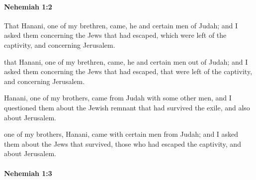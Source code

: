 		\paragraph{Nehemiah 1:2} %
			\label{NEHEMIAH-1-2}

			That Hanani, one of my brethren, came, he and certain men of Judah; and I asked them concerning the Jews that had escaped, which were left of the captivity, and concerning Jerusalem.

			\begin{versebox}
					\item[BHS] 
					\item[LXX] 
					\item[ASV] that Hanani, one of my brethren, came, he and certain men out of Judah; and I asked them concerning the Jews that had escaped, that were left of the captivity, and concerning Jerusalem.
					\item[NIV] Hanani, one of my brothers, came from Judah with some other men, and I questioned them about the Jewish remnant that had survived the exile, and also about Jerusalem.
					\item[NRSV] one of my brothers, Hanani, came with certain men from Judah; and I asked them about the Jews that survived, those who had escaped the captivity, and about Jerusalem.
			\end{versebox}

		\paragraph{Nehemiah 1:3} %
			\label{NEHEMIAH-1-3}

